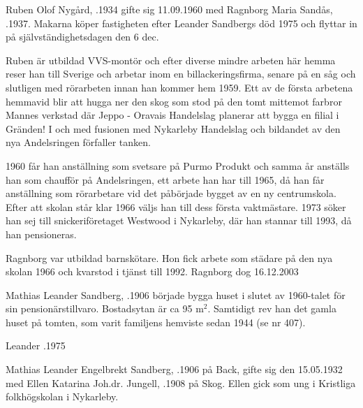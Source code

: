 {{{{
Ruben Olof Nygård, .1934 gifte sig 11.09.1960 med Ragnborg Maria Sandås, .1937. Makarna köper fastigheten efter Leander Sandbergs död 1975 och flyttar in på självständighetsdagen den 6 dec.

Ruben är utbildad VVS-montör och efter diverse mindre arbeten här hemma reser han till Sverige och arbetar inom en billackeringsfirma, senare på en såg och slutligen med rörarbeten innan han kommer hem 1959. Ett av de första arbetena hemmavid blir att hugga ner den skog som stod på den tomt mittemot farbror Mannes verkstad där Jeppo - Oravais Handelslag planerar att bygga en filial i Gränden! I och med fusionen med Nykarleby Handelslag och bildandet av den nya Andelsringen förfaller tanken.

1960 får han anställning som svetsare på Purmo Produkt och samma år anställs han som chaufför på Andelsringen, ett arbete han har till 1965, då han får anställning som rörarbetare vid det påbörjade bygget av en ny centrumskola. Efter att skolan står klar 1966 väljs han till dess första vaktmästare. 1973 söker han sej till snickeriföretaget Westwood i Nykarleby, där han stannar till 1993, då han pensioneras.

Ragnborg var utbildad barnskötare. Hon fick arbete som städare på den nya skolan 1966 och kvarstod i tjänst till 1992. Ragnborg dog 16.12.2003
\begin{jhchildren}
  \item {}
  \item {}
  \item {}
\end{jhchildren}


Mathias Leander Sandberg, .1906 började bygga huset i slutet av 1960-talet för sin pensionärstillvaro. Bostadsytan är ca 95 m$^2$. Samtidigt rev han det gamla huset på tomten, som varit familjens hemviste sedan 1944 (se nr 407).

Leander .1975





Mathias Leander Engelbrekt Sandberg, .1906 på Back, gifte sig den 15.05.1932 med Ellen Katarina Joh.dr. Jungell, .1908 på Skog. Ellen gick som ung i Kristliga folkhögskolan i Nykarleby.

}}}}
